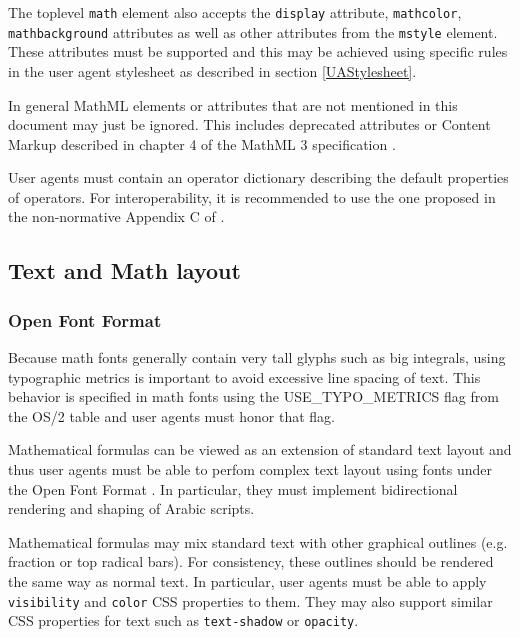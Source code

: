 The toplevel {\tt math} element also accepts the {\tt display} attribute,
{\tt mathcolor}, {\tt mathbackground} attributes as well as other attributes
from the {\tt mstyle} element. These attributes must be supported and this
may be achieved using specific rules in the user agent stylesheet
as described in section \ref{UAStylesheet}.

In general MathML elements or attributes that are not mentioned in this
document may just be ignored. This includes deprecated attributes or
Content Markup described in chapter 4 of the MathML 3 specification
\cite{MathML3}.

User agents must contain an operator dictionary describing the default
properties of operators. For interoperability, it is recommended to use the one
proposed in the non-normative Appendix C of \cite{MathML3}.

\subsection{Text and Math layout}

\subsubsection{Open Font Format}

Because math fonts generally contain very tall glyphs such as big integrals,
using typographic metrics is important to avoid excessive line spacing of text.
This behavior is specified in math fonts using the USE\_TYPO\_METRICS flag from
the OS/2 table \cite{OpenFontFormat3} and user agents must honor that flag.

Mathematical formulas can be viewed as an extension of standard text layout
and thus user agents must be able to perfom
complex text layout \cite{CTL} using fonts under the Open Font Format
\cite{OpenFontFormat3}. In particular, they must implement bidirectional
rendering and shaping of Arabic scripts.

Mathematical formulas may mix standard text with other graphical outlines
(e.g. fraction or top radical bars). For consistency, these outlines should
be rendered the same way as normal text. In particular, user agents must be
able to apply {\tt visibility} and {\tt color} CSS properties to them. They may
also support similar CSS properties for text such as {\tt text-shadow} or
{\tt opacity}.

